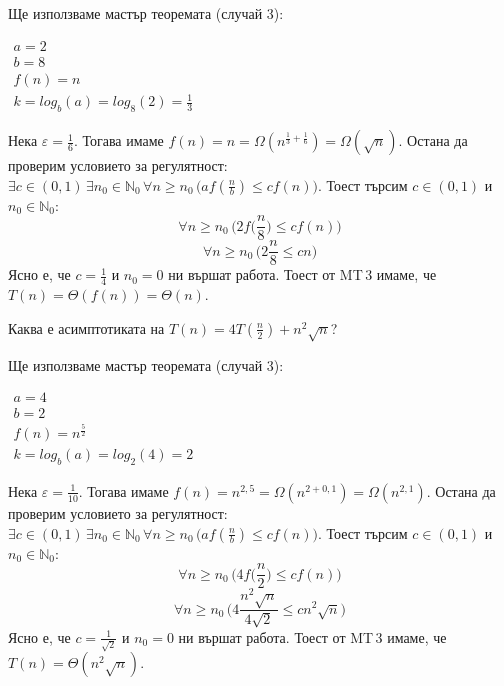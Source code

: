 \begin{solution}
	Ще използваме $\hyperref[th:master-theorem]{\text{мастър теоремата}}$ (случай 3):
	\begin{center}
		$\begin{array}{|l}
			a=2\\
			b=8\\
			f(n)=n\\
			k=log_b(a)=log_8(2)=\frac13
		\end{array}$
	\end{center}
	Нека $\varepsilon=\frac16$. Тогава имаме $f(n)=n=\Omega(n^{\frac13+\frac16})=\Omega(\sqrt n)$. Остана да проверим условието за регулятност: $\exists c\in(0,1)\,\exists n_0\in\mathbb{N}_0\,\forall n\ge n_0\,\big(af(\frac nb)\le cf(n)\big)$. Тоест търсим $c\in(0,1)$ и $n_0\in\mathbb{N}_0$:
	\begin{equation*}
		\forall n\ge n_0\,\bigg(2f\Big(\frac n8\Big)\le cf(n)\bigg)
	\end{equation*}
	\begin{equation*}
		\forall n\ge n_0\,\bigg(2\frac n8\le cn\bigg)
	\end{equation*}
	Ясно е, че $c=\frac14$ и $n_0=0$ ни вършат работа. Тоест от MT\,3 имаме, че $T(n)=\Theta(f(n))=\Theta(n)$.
\end{solution}\leavevmode\newline

\begin{problem}
	Каква е асимптотиката на $T(n)=4T(\frac n2)+n^2\sqrt n$?
\end{problem}

\begin{solution}
	Ще използваме $\hyperref[th:master-theorem]{\text{мастър теоремата}}$ (случай 3):
	\begin{center}
		$\begin{array}{|l}
			a=4\\
			b=2\\
			f(n)=n^{\frac52}\\
			k=log_b(a)=log_2(4)=2
		\end{array}$
	\end{center}
	Нека $\varepsilon=\frac1{10}$. Тогава имаме $f(n)=n^{2,5}=\Omega(n^{2+0,1})=\Omega(n^{2,1})$. Остана да проверим условието за регулятност: $\exists c\in(0,1)\,\exists n_0\in\mathbb{N}_0\,\forall n\ge n_0\,\big(af(\frac nb)\le cf(n)\big)$. Тоест търсим $c\in(0,1)$ и $n_0\in\mathbb{N}_0$:
	\begin{equation*}
		\forall n\ge n_0\,\bigg(4f\Big(\frac n2\Big)\le cf(n)\bigg)
	\end{equation*}
	\begin{equation*}
		\forall n\ge n_0\,\bigg(4\frac {n^2\sqrt n}{4\sqrt2}\le cn^2\sqrt n\bigg)
	\end{equation*}
	Ясно е, че $c=\frac1{\sqrt2}$ и $n_0=0$ ни вършат работа. Тоест от MT\,3 имаме, че $T(n)=\Theta(n^2\sqrt n)$.
\end{solution}\leavevmode\newline

